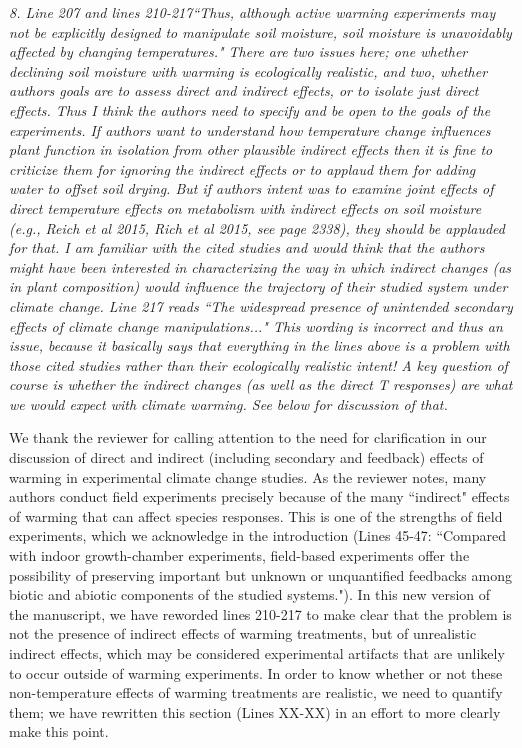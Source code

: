 \documentclass[11pt,a4paper]{letter}
\begin{document}
\begin{letter}{}
\emph{8. Line 207 and lines 210-217``Thus, although active warming experiments may not be explicitly designed to manipulate soil
moisture, soil moisture is unavoidably affected by changing temperatures." There are two issues here; one whether declining soil moisture with warming is ecologically
realistic, and two, whether authors goals are to assess direct and indirect effects, or to isolate
just direct effects. Thus I think the authors need to specify and be open to the goals of the
experiments. If authors want to understand how temperature change influences plant function
in isolation from other plausible indirect effects then it is fine to criticize them for ignoring the
indirect effects or to applaud them for adding water to offset soil drying. But if authors intent
was to examine joint effects of direct temperature effects on metabolism with indirect effects
on soil moisture (e.g., Reich et al 2015, Rich et al 2015, see page 2338), they should be
applauded for that. I am familiar with the cited studies and would think that the authors might
have been interested in characterizing the way in which indirect changes (as in plant
composition) would influence the trajectory of their studied system under climate change.
Line 217 reads ``The widespread presence of unintended secondary effects of climate change
manipulations..." This wording is incorrect and thus an issue, because it basically says that everything in the lines
above is a problem with those cited studies rather than their ecologically realistic intent! A key
question of course is whether the indirect changes (as well as the direct T responses) are what
we would expect with climate warming. See below for discussion of that.}

We thank the reviewer for calling attention to the need for clarification in our discussion of direct and indirect (including secondary and feedback) effects of warming in experimental climate change studies. As the reviewer notes, many authors conduct field experiments precisely because of the many ``indirect" effects of warming that can affect species responses. This is one of the strengths of field experiments, which we acknowledge in the introduction (Lines 45-47: ``Compared with indoor growth-chamber experiments, field-based experiments offer the possibility of preserving important but unknown or unquantified feedbacks among biotic and abiotic components of the studied systems."). In this new version of the manuscript, we have reworded lines 210-217 to make clear that the problem is not the presence of indirect effects of warming treatments, but of unrealistic indirect effects, which may be considered experimental artifacts that are unlikely to occur outside of warming experiments. In order to know whether or not these non-temperature effects of warming treatments are realistic, we need to quantify them; we have rewritten this section (Lines XX-XX) in an effort to more clearly make this point.


\end{letter}
\end{document}
